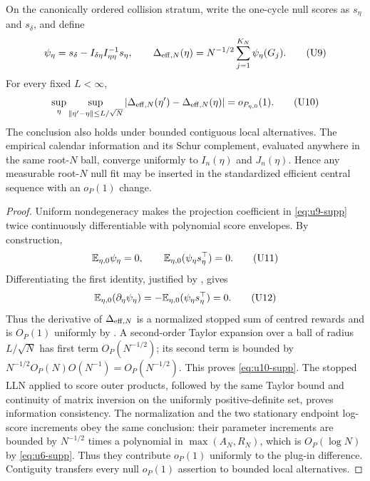 \begin{lemma}
\label{lem:efficient-score-plugin-main}
On the canonically ordered collision stratum, write the one-cycle null scores
as \(s_\eta\) and \(s_\delta\), and define
\[
 \psi_\eta=s_\delta-I_{\delta\eta}I_{\eta\eta}^{-1}s_\eta,
 \qquad
 \Delta_{{\rm eff},N}(\eta)=N^{-1/2}
 \sum_{j=1}^{K_N}\psi_\eta(G_j).
\tag{U9}\label{eq:u9-supp}
\]
For every fixed \(L<\infty\),
\[
 \sup_{\eta}\sup_{\|\eta'-\eta\|\le L/\sqrt N}
 |\Delta_{{\rm eff},N}(\eta')-\Delta_{{\rm eff},N}(\eta)|
 =o_{P_{\eta,0}}(1).
\tag{U10}\label{eq:u10-supp}
\]
The conclusion also holds under bounded contiguous local alternatives.  The
empirical calendar information and its Schur complement, evaluated anywhere
in the same root-\(N\) ball, converge uniformly to \(I_n(\eta)\) and
\(J_n(\eta)\).  Hence any measurable root-\(N\) null fit may be inserted in
the standardized efficient central sequence with an \(o_P(1)\) change.
\end{lemma}

\begin{proof}
Uniform nondegeneracy makes the projection coefficient in \eqref{eq:u9-supp} twice
continuously differentiable with polynomial score envelopes.  By construction,
\[
 \mathbb E_{\eta,0}\psi_\eta=0,
 \qquad \mathbb E_{\eta,0}(\psi_\eta s_\eta^\top)=0.
\tag{U11}\label{eq:u11-supp}
\]
Differentiating the first identity, justified by
, gives
\[
 \mathbb E_{\eta,0}(\partial_\eta\psi_\eta)
 =-\mathbb E_{\eta,0}(\psi_\eta s_\eta^\top)=0.
\tag{U12}\label{eq:u12-supp}
\]
Thus the derivative of \(\Delta_{{\rm eff},N}\) is a normalized stopped sum
of centred rewards and is \(O_P(1)\) uniformly by
.  A second-order Taylor expansion
over a ball of radius \(L/\sqrt N\) has first term \(O_P(N^{-1/2})\); its
second term is bounded by
\(N^{-1/2}O_P(N)O(N^{-1})=O_P(N^{-1/2})\).  This proves \eqref{eq:u10-supp}.
The stopped LLN applied to score outer products, followed by the same Taylor
bound and continuity of matrix inversion on the uniformly positive-definite
set, proves information consistency.  The normalization and the two
stationary endpoint log-score increments obey the same conclusion: their parameter
increments are bounded by \(N^{-1/2}\) times a polynomial in
\(\max(A_N,R_N)\), which is \(O_P(\log N)\) by \eqref{eq:u6-supp}.  Thus they
contribute \(o_P(1)\) uniformly to the plug-in difference.  Contiguity
transfers every null \(o_P(1)\) assertion to bounded local alternatives.
\end{proof}
